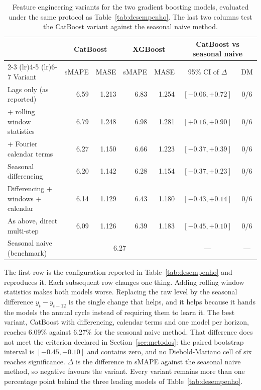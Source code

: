 \begin{table}[htbp]
\centering
\small
\setlength{\tabcolsep}{4pt}
\caption{Feature engineering variants for the two gradient boosting models, evaluated under
the same protocol as Table~\ref{tab:desempenho}. The last two columns test the CatBoost
variant against the seasonal naive method.}
\label{tab:variantes}
\begin{tabular}{lrrrrcc}
\toprule
& \multicolumn{2}{c}{CatBoost} & \multicolumn{2}{c}{XGBoost}
& \multicolumn{2}{c}{CatBoost vs seasonal naive} \\
\cmidrule(lr){2-3} \cmidrule(lr){4-5} \cmidrule(lr){6-7}
Variant & sMAPE & MASE & sMAPE & MASE & 95\% CI of $\Delta$ & DM \\
\midrule
Lags only (as reported) & 6.59 & 1.213 & 6.83 & 1.254 & $[-0.06, +0.72]$ & 0/6 \\
+ rolling window statistics & 6.79 & 1.248 & 6.98 & 1.281 & $[+0.16, +0.90]$ & 0/6 \\
+ Fourier calendar terms & 6.27 & 1.150 & 6.66 & 1.223 & $[-0.37, +0.39]$ & 0/6 \\
Seasonal differencing & 6.20 & 1.142 & 6.28 & 1.154 & $[-0.37, +0.23]$ & 0/6 \\
Differencing + windows + calendar & 6.14 & 1.129 & 6.43 & 1.180 & $[-0.43, +0.14]$ & 0/6 \\
As above, direct multi-step & 6.09 & 1.126 & 6.39 & 1.183 & $[-0.45, +0.10]$ & 0/6 \\
\midrule
Seasonal naive (benchmark) & \multicolumn{4}{c}{6.27 \quad 1.148} & --- & --- \\
\bottomrule
\end{tabular}

\vspace{0.5em}
\begin{minipage}{\textwidth}
\footnotesize
The first row is the configuration reported in Table~\ref{tab:desempenho} and reproduces it.
Each subsequent row changes one thing. Adding rolling window statistics makes both models
worse. Replacing the raw level by the seasonal difference $y_t - y_{t-12}$ is the single
change that helps, and it helps because it hands the models the annual cycle instead of
requiring them to learn it. The best variant, CatBoost with differencing, calendar terms and
one model per horizon, reaches 6.09\% against
6.27\% for the seasonal naive method. That difference does not meet the
criterion declared in Section~\ref{sec:metodos}: the paired bootstrap interval is
$[-0.45,
+0.10]$ and contains zero, and no
Diebold-Mariano cell of six reaches significance. $\Delta$ is the difference in sMAPE
against the seasonal naive method, so negative favours the variant. Every variant remains
more than one percentage point behind the three leading models of
Table~\ref{tab:desempenho}.
\end{minipage}
\end{table}